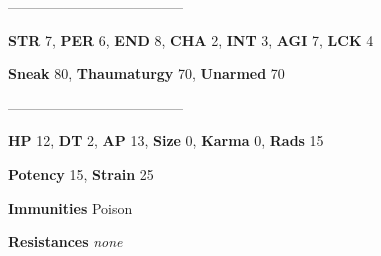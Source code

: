 \documentclass[11pt,a4paper,twocolumn]{book}
\begin{document}
%	
%
%

	--------------------------------------
	
	\noindent
	\textbf{STR} 7, \textbf{PER} 6, \textbf{END} 8, \textbf{CHA} 2, \textbf{INT} 3, \textbf{AGI} 7, \textbf{LCK} 4
	
	\noindent
	\textbf{Sneak} 80, \textbf{Thaumaturgy} 70, \textbf{Unarmed} 70
	
	--------------------------------------
	
	\noindent
	\textbf{HP} 12, \textbf{DT} 2, \textbf{AP} 13, \textbf{Size} 0, \textbf{Karma} 0, \textbf{Rads} 15
	
	\noindent
	\textbf{Potency} 15, \textbf{Strain} 25
	
	\noindent
	\textbf{Immunities} Poison
	
	\noindent
	\textbf{Resistances} \emph{none}
	
\end{document}
